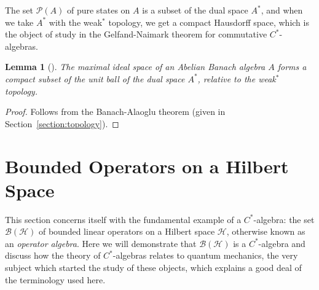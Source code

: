 \documentclass[11pt,a4paper]{report}
\theoremstyle{plain}
\newtheorem{lemma}{Lemma}
\theoremstyle{definition}
\newcommand{\1}{\mathbbm{1}}
\renewcommand{\H}{\mathcal{H}}
\newcommand{\B}{\mathcal{B}}
\renewcommand{\P}[1]{\mathscr{P}(#1)}
\begin{document}
The set $\P A$ of pure states on $A$ is a subset of the dual space $A^\ast$, and 
when we take $A^\ast$ with the weak$^\ast$ topology, we get a compact Hausdorff 
space, which is the object of study in the Gelfand-Naimark theorem for 
commutative $C^\ast$-algebras.


\begin{lemma}[{\cite[3.2.20]{kadison83}}]\label{lemma:3220}
	The maximal ideal space of an Abelian Banach algebra $A$ forms a compact subset of 
	the unit ball of the dual space $A^\ast$, relative to the weak$^\ast$ topology.
\end{lemma}
\begin{proof}
	Follows from the Banach-Alaoglu theorem (given in Section~\ref{section:topology}).
\end{proof}




\section{Bounded Operators on a Hilbert Space}\label{section:bh}
This section concerns itself with the fundamental example of a $C^\ast$-algebra: the set 
$\B(\H)$ of bounded linear operators on a Hilbert space $\H$, otherwise known as 
an \emph{operator algebra}. Here we will demonstrate that $\B(\H)$ is a 
$C^\ast$-algebra and discuss how the theory of $C^\ast$-algebras relates to 
quantum mechanics, the very subject which started the study of these objects, 
which explains a good deal of the terminology used here. 
\end{document}
